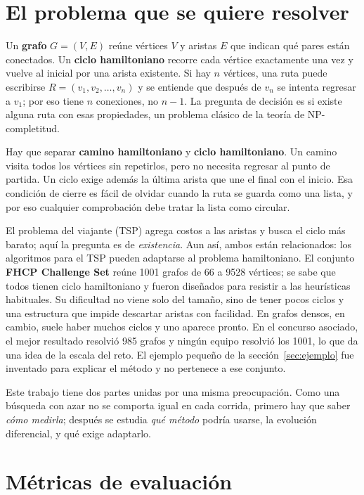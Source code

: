 \documentclass[letterpaper,12pt]{report}
\begin{document}
\section{El problema que se quiere resolver}
Un \textbf{grafo} $G=(V,E)$ reúne vértices $V$ y aristas $E$ que indican qué pares están conectados. Un \textbf{ciclo hamiltoniano} recorre cada vértice exactamente una vez y vuelve al inicial por una arista existente. Si hay $n$ vértices, una ruta puede escribirse $R=(v_1,v_2,\ldots,v_n)$ y se entiende que después de $v_n$ se intenta regresar a $v_1$; por eso tiene $n$ conexiones, no $n-1$. La pregunta de decisión es si existe alguna ruta con esas propiedades, un problema clásico de la teoría de NP-completitud.

Hay que separar \textbf{camino hamiltoniano} y \textbf{ciclo hamiltoniano}. Un camino visita todos los vértices sin repetirlos, pero no necesita regresar al punto de partida. Un ciclo exige además la última arista que une el final con el inicio. Esa condición de cierre es fácil de olvidar cuando la ruta se guarda como una lista, y por eso cualquier comprobación debe tratar la lista como circular.

El problema del viajante (TSP) agrega costos a las aristas y busca el ciclo más barato; aquí la pregunta es de \emph{existencia}. Aun así, ambos están relacionados: los algoritmos para el TSP pueden adaptarse al problema hamiltoniano. El conjunto \textbf{FHCP Challenge Set} reúne 1001 grafos de 66 a 9528 vértices; se sabe que todos tienen ciclo hamiltoniano y fueron diseñados para resistir a las heurísticas habituales. Su dificultad no viene solo del tamaño, sino de tener pocos ciclos y una estructura que impide descartar aristas con facilidad. En grafos densos, en cambio, suele haber muchos ciclos y uno aparece pronto. En el concurso asociado, el mejor resultado resolvió 985 grafos y ningún equipo resolvió los 1001, lo que da una idea de la escala del reto. El ejemplo pequeño de la sección~\ref{sec:ejemplo} fue inventado para explicar el método y no pertenece a ese conjunto.

Este trabajo tiene dos partes unidas por una misma preocupación. Como una búsqueda con azar no se comporta igual en cada corrida, primero hay que saber \emph{cómo medirla}; después se estudia \emph{qué método} podría usarse, la evolución diferencial, y qué exige adaptarlo.

\section{Métricas de evaluación}
\end{document}
